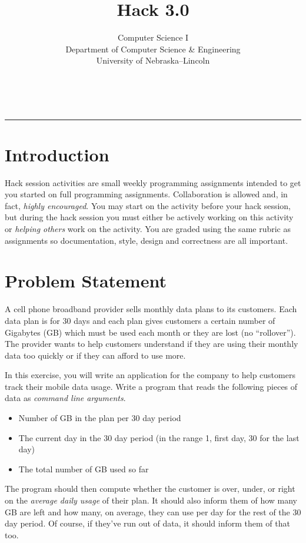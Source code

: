 \documentclass[12pt]{scrartcl}
\title{Hack 3.0}\let\Title\@title
\subtitle{Computer Science I\\
{\small
\vskip1cm
Department of Computer Science \& Engineering \\
University of Nebraska--Lincoln}
\vskip-1cm}
\date{~}
\begin{document}
\maketitle

\hrule

\section*{Introduction}

Hack session activities are small weekly programming assignments 
intended to get you started on full programming assignments.  
Collaboration is allowed and, in fact, \emph{highly encouraged}.  
You may start on the activity before
your hack session, but during the hack session you must either be actively 
working on this activity or \emph{helping others} work on the activity.
You are graded using the same rubric as assignments so documentation, style, design and correctness are all important.  

\section*{Problem Statement}

A cell phone broadband provider sells monthly data plans to its
customers.  Each data plan is for 30 days and each plan gives
customers a certain number of Gigabytes (GB) which must be used 
each month or they are lost (no ``rollover'').  The provider wants
to help customers understand if they are using their monthly data
too quickly or if they can afford to use more.

In this exercise, you will write an application for the company
to help customers track their mobile data usage.  Write a program
that reads the following pieces of data as \emph{command line arguments}.
\begin{itemize}
  \item Number of GB in the plan per 30 day period
  \item The current day in the 30 day period (in the range 1, first day, 
  30 for the last day)
  \item The total number of GB used so far
\end{itemize}
The program should then compute whether the customer is over, 
under, or right on the \emph{average daily usage} of their plan.  
It should also inform them of how many GB are left and how many, 
on average, they can use per day for the rest of the 30 day period.  
Of course, if they've run out of data, it should inform them of that 
too.
\end{document}
